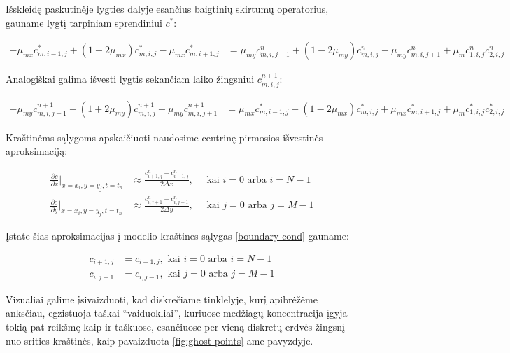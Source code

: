 Išskleidę paskutinėje lygties dalyje esančius baigtinių skirtumų operatorius, gauname lygtį tarpiniam sprendiniui $c^*$:

\begin{align} \label{eqs:adi-short-half}
  -\mu_{mx}c^{*}_{m,i-1,j}+(1+2\mu_{mx})c^{*}_{m,i,j}-\mu_{mx}c^{*}_{m,i+1,j}
  &= \mu_{my}c^n_{m,i,j-1}+(1-2\mu_{my})c^n_{m,i,j}+\mu_{my}c^n_{m,i,j+1}+\mu_m c^n_{1,i,j}c^n_{2,i,j}
\end{align}

Analogiškai galima išvesti lygtis sekančiam laiko žingsniui $c^{n+1}_{m,i,j}$:

\begin{align} \label{eqs:adi-short-next}
  -\mu_{my}c^{n+1}_{m,i,j-1}+(1+2\mu_{my})c^{n+1}_{m,i,j}-\mu_{my}c^{n+1}_{m,i,j+1}
  &= \mu_{mx}c^*_{m,i-1,j}+(1-2\mu_{mx})c^*_{m,i,j}+\mu_{mx}c^*_{m,i+1,j}+\mu_m c^*_{1,i,j}c^*_{2,i,j}
\end{align}

Kraštinėms sąlygoms apskaičiuoti naudosime centrinę pirmosios išvestinės aproksimaciją:

\begin{align*}
  \frac{\partial c}{\partial x}\Big|_{x=x_i, y=y_j, t=t_n} 
  &\approx \frac{c^n_{i+1,j}-c^n_{i-1,j}}{2\Delta x},\quad
  \text{ kai } i = 0 \text{ arba } i = N - 1
  \\
  \frac{\partial c}{\partial y}\Big|_{x=x_i, y=y_j, t=t_n} 
  &\approx \frac{c^n_{i,j+1}-c^n_{i,j-1}}{2\Delta y},\quad
  \text{ kai } j = 0 \text{ arba } j = M - 1
\end{align*}

Įstate šias aproksimacijas į modelio kraštines sąlygas \eqref{boundary-cond} gauname:

\begin{subequations} \label{boundary-cond-approx}
\begin{align} 
  c_{i+1,j} &= c_{i-1,j}, \text{ kai } i = 0 \text{ arba } i = N-1 \\
  c_{i,j+1} &= c_{i,j-1}, \text{ kai } j = 0 \text{ arba } j = M-1
\end{align}
\end{subequations}

\newpage

Vizualiai galime įsivaizduoti, kad diskrečiame tinklelyje, kurį apibrėžėme anksčiau, egzistuoja taškai \enquote{vaiduokliai}, kuriuose medžiagų koncentracija įgyja tokią pat reikšmę kaip ir taškuose, esančiuose per vieną diskretų erdvės žingsnį nuo srities kraštinės, kaip pavaizduota \ref{fig:ghost-points}-ame pavyzdyje.

